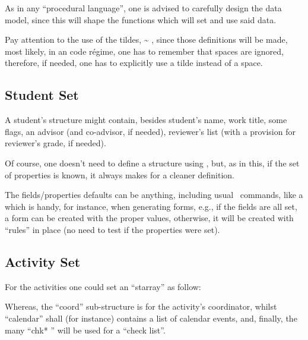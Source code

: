 \documentclass[10pt]{article}
\begin{document}
\begin{tsremark}
As in any ``procedural language'', one is advised to  carefully design the data model, since this will shape the functions which will set and use said data.
\end{tsremark}

\begin{tsremark}
  Pay attention to the use of the tildes,  \~{} , since those definitions will be made, most likely, in an  code régime, one has to remember that spaces are ignored, therefore, if needed, one has to explicitly use a tilde instead of a space.
\end{tsremark}


\subsection{Student Set}
A student's structure might contain, besides student's name, work title, some flags, an advisor (and co-advisor, if needed), reviewer's list (with a provision for reviewer's grade, if needed).

Of course, one doesn't need to define a  structure using , but, as in this,  if the set of properties is known, it always makes for a cleaner definition.

\begin{tsremark}
  The fields/properties defaults can be anything, including usual \LaTeXe\  commands, like a \tsobj{\rule} which is handy, for instance, when generating forms, e.g., if the fields are all set, a form can be created with the proper values, otherwise, it will be  created with ``rules'' in place (no need to test if the properties were set).
\end{tsremark}




\subsection{Activity Set}\label{Activity-set}
For the activities one could set an ``starray'' as follow:









Whereas, the ``coord'' sub-structure is for the activity's coordinator, whilst ``calendar'' shall (for instance) contains a list of calendar events, and, finally, the many ``chk* '' will be used for a ``check list''.
\end{document}
